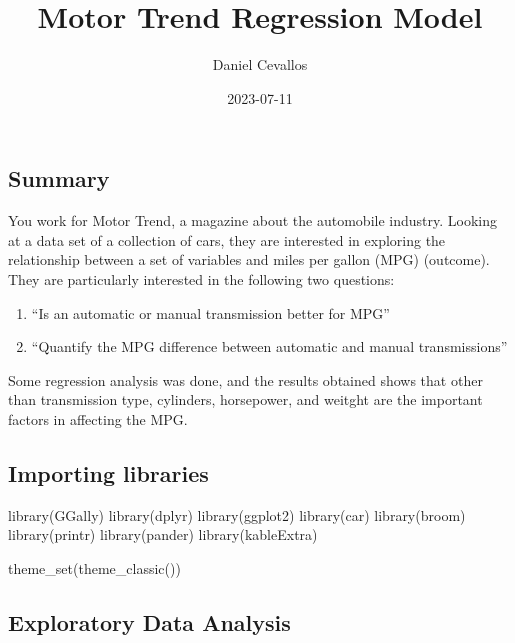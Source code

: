 \documentclass[
]{article}
\title{Motor Trend Regression Model}
\author{Daniel Cevallos}
\date{2023-07-11}
\newenvironment{Shaded}{\begin{snugshade}}{\end{snugshade}}
\newcommand{\FunctionTok}[1]{\textcolor[rgb]{0.00,0.00,0.00}{#1}}
\newcommand{\NormalTok}[1]{#1}
\providecommand{\tightlist}{%
  \setlength{\itemsep}{0pt}\setlength{\parskip}{0pt}}
\begin{document}
\maketitle

\hypertarget{summary}{%
\subsection{Summary}\label{summary}}

You work for Motor Trend, a magazine about the automobile industry.
Looking at a data set of a collection of cars, they are interested in
exploring the relationship between a set of variables and miles per
gallon (MPG) (outcome). They are particularly interested in the
following two questions:

\begin{enumerate}
\def\labelenumi{\arabic{enumi}.}
\tightlist
\item
  ``Is an automatic or manual transmission better for MPG''
\item
  ``Quantify the MPG difference between automatic and manual
  transmissions''
\end{enumerate}

Some regression analysis was done, and the results obtained shows that
other than transmission type, cylinders, horsepower, and weitght are the
important factors in affecting the MPG.

\hypertarget{importing-libraries}{%
\subsection{Importing libraries}\label{importing-libraries}}

\begin{Shaded}
\begin{Highlighting}[]
\FunctionTok{library}\NormalTok{(GGally)}
\FunctionTok{library}\NormalTok{(dplyr)}
\FunctionTok{library}\NormalTok{(ggplot2)}
\FunctionTok{library}\NormalTok{(car)}
\FunctionTok{library}\NormalTok{(broom)}
\FunctionTok{library}\NormalTok{(printr)}
\FunctionTok{library}\NormalTok{(pander)}
\FunctionTok{library}\NormalTok{(kableExtra)}

\FunctionTok{theme\_set}\NormalTok{(}\FunctionTok{theme\_classic}\NormalTok{())}
\end{Highlighting}
\end{Shaded}

\hypertarget{exploratory-data-analysis}{%
\subsection{Exploratory Data Analysis}\label{exploratory-data-analysis}}
\end{document}
